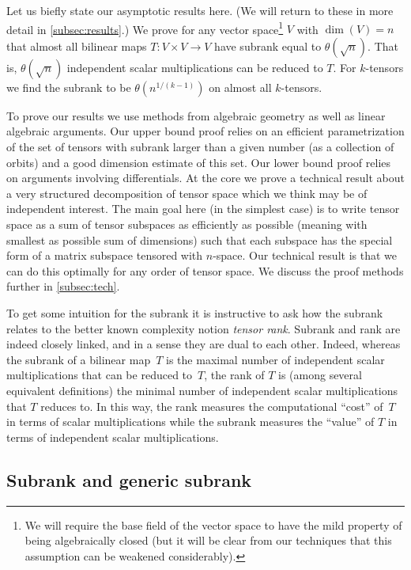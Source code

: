 \documentclass[11pt]{article}
\theoremstyle{definition}
\theoremstyle{remark}
\begin{document}
Let us biefly state our asymptotic results here. (We will return to these in more detail in \autoref{subsec:results}.) We prove for any vector space\footnote{We will require the base field of the vector space to have the mild property of being algebraically closed (but it will be clear from our techniques that this assumption can be weakened considerably).} $V$ with $\dim(V) = n$ that almost all bilinear maps $T : V \times V \to V$ have subrank equal to $\theta(\sqrt{n})$. That is, $\theta(\sqrt{n})$ independent scalar multiplications can be reduced to $T$. For $k$-tensors we find the subrank to be $\theta(n^{1/(k-1)})$ on almost all $k$-tensors.

%

To prove our results we use methods from algebraic geometry as well as linear algebraic arguments. Our upper bound proof relies on an efficient parametrization of the set of tensors with subrank larger than a given number (as a collection of orbits) and a good dimension estimate of this set.
Our lower bound proof relies on arguments involving differentials. At the core we prove a technical result about a very structured decomposition of tensor space which we think may be of independent interest. The main goal here (in the simplest case) is to write tensor space as a sum of tensor subspaces as efficiently as possible (meaning with smallest as possible sum of dimensions) such that each subspace has the special form of a matrix subspace tensored with $n$-space. Our technical result is that we can do this optimally for any order of tensor space. We discuss the proof methods further in \autoref{subsec:tech}.
%

%
To get some intuition for the subrank it is instructive to ask how the subrank relates to the better known complexity notion \emph{tensor rank}.
Subrank and rank are indeed closely linked, and in a sense they are dual to each other. Indeed, whereas the subrank of a bilinear map~$T$ is the maximal number of independent scalar multiplications that can be reduced to~$T$, the rank of $T$ is (among several equivalent definitions) the minimal number of independent scalar multiplications that $T$ reduces to. In this way, the rank measures the computational ``cost'' of~$T$ in terms of scalar multiplications while the subrank measures the ``value'' of $T$ in terms of independent scalar multiplications.

%

\subsection{Subrank and generic subrank}
\end{document}
